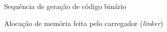 \begin{frame}{Sequência de geração de código binário}
  


\end{frame}

\begin{frame}{Alocação de memória feita pelo carregador ({\em linker})}
  
\begin{center}

\end{center}

\end{frame}


\section{\insertlecture}

